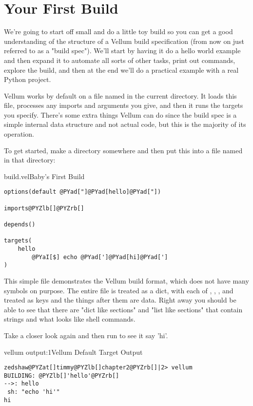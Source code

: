 \section{Your First Build}

We're going to start off small and do a little toy build so you can get a good
understanding of the structure of a Vellum build specification (from now on just
referred to as a "build spec").  We'll start by having it do a hello
world example and then expand it to automate all sorts of other tasks, print out
commands, explore the build, and then at the end we'll do a practical example
with a real Python project.

Vellum works by default on a file named  in the current
directory.  It loads this file, processes any imports and arguments you give,
and then it runs the targets you specify.  There's some extra things Vellum
can do since the build spec is a simple internal data structure and not
actual code, but this is the majority of its operation.

To get started, make a directory somewhere and then put this into a file named
 in that directory:

\begin{code}{build.vel}{Baby's First Build}
\begin{Verbatim}[commandchars=@\[\]]
options(default @PYad["]@PYad[hello]@PYad["])

imports@PYZlb[]@PYZrb[] 

depends()

targets(
    hello 
        @PYaI[$] echo @PYad[']@PYad[hi]@PYad[']
)
\end{Verbatim}

\end{code}

This simple file demonstrates the Vellum build format, which does not have many
symbols on purpose.  The entire file is treated as a dict, with each of
, , , and  treated
as keys and the things after them are data.  Right away you should be able to
see that there are "dict like sections" and "list like sections" that contain
strings and what looks like shell commands.

Take a closer look again and then run  to see it say 'hi'.

\begin{code}{vellum output:1}{Vellum Default Target Output}
\begin{Verbatim}[commandchars=@\[\]]
zedshaw@PYZat[]timmy@PYZlb[]chapter2@PYZrb[]|2> vellum
BUILDING: @PYZlb[]'hello'@PYZrb[]
-->: hello
 sh: "echo 'hi'"
hi
\end{Verbatim}

\end{code}

